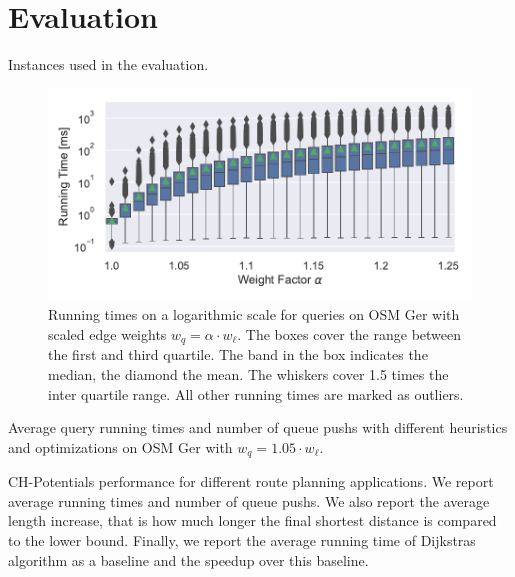 \documentclass[a4paper,USenglish,cleveref, autoref, thm-restate]{lipics-v2019}
\begin{document}
\section{Evaluation}

\label{sec:experiments}

\begin{table}
\centering
\caption{Instances used in the evaluation.}\label{tab:graphs}

\end{table}

\begin{figure}
\centering
\includegraphics[width=\linewidth]{fig/scaled_weights.pdf}
\caption{
Running times on a logarithmic scale for queries on OSM Ger with scaled edge weights $w_q = \alpha \cdot w_\ell$.
The boxes cover the range between the first and third quartile.
The band in the box indicates the median, the diamond the mean.
The whiskers cover 1.5 times the inter quartile range.
All other running times are marked as outliers.
}\label{fig:scaled_weights}
\end{figure}

\begin{table}
\centering
\caption{Average query running times and number of queue pushs with different heuristics and optimizations on OSM Ger with $w_q = 1.05 \cdot w_\ell$.}\label{tab:building_blocks}

\end{table}

\begin{table}
\centering
\caption{
CH-Potentials performance for different route planning applications.
We report average running times and number of queue pushs.
We also report the average length increase, that is how much longer the final shortest distance is compared to the lower bound.
Finally, we report the average running time of Dijkstras algorithm as a baseline and the speedup over this baseline.
}\label{tab:applications}

\end{table}
\end{document}
